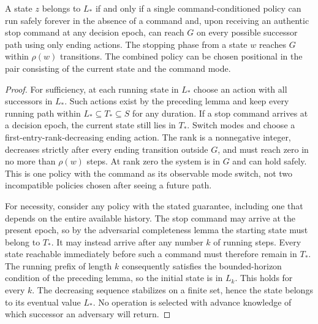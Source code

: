 \begin{Coretheorem}\label{Core:r:joint-ending}
A state $z$ belongs to $L_*$ if and only if a single command-conditioned policy can run safely forever in the absence of a command and, upon receiving an authentic stop command at any decision epoch, can reach $G$ on every possible successor path using only ending actions. The stopping phase from a state $w$ reaches $G$ within $\rho(w)$ transitions. The combined policy can be chosen positional in the pair consisting of the current state and the command mode.
\end{Coretheorem}
\begin{proof}
For sufficiency, at each running state in $L_*$ choose an action with all successors in $L_*$. Such actions exist by the preceding lemma and keep every running path within $L_*\subseteq T_*\subseteq S$ for any duration. If a stop command arrives at a decision epoch, the current state still lies in $T_*$. Switch modes and choose a first-entry-rank-decreasing ending action. The rank is a nonnegative integer, decreases strictly after every ending transition outside $G$, and must reach zero in no more than $\rho(w)$ steps. At rank zero the system is in $G$ and can hold safely. This is one policy with the command as its observable mode switch, not two incompatible policies chosen after seeing a future path.

For necessity, consider any policy with the stated guarantee, including one that depends on the entire available history. The stop command may arrive at the present epoch, so by the adversarial completeness lemma the starting state must belong to $T_*$. It may instead arrive after any number $k$ of running steps. Every state reachable immediately before such a command must therefore remain in $T_*$. The running prefix of length $k$ consequently satisfies the bounded-horizon condition of the preceding lemma, so the initial state is in $L_k$. This holds for every $k$. The decreasing sequence stabilizes on a finite set, hence the state belongs to its eventual value $L_*$. No operation is selected with advance knowledge of which successor an adversary will return.
\end{proof}

